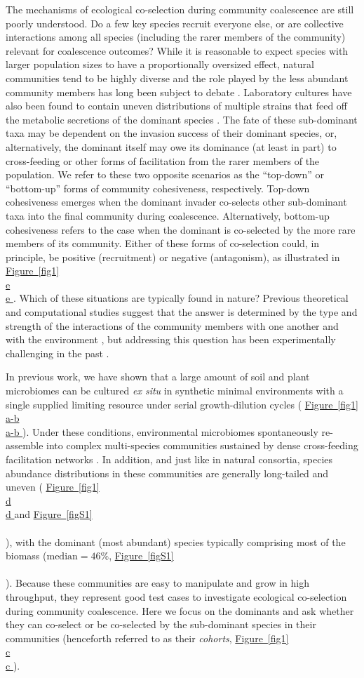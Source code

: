 \documentclass[a4paper,10pt]{article}
\newcommand{\figref}[2][]{%
  \hyperref[{#2}]{%
    Figure~\ref*{#2}%
    \ifx\\#1\\%
    \else
      #1%
    \fi
  }%
}
\begin{document}
The mechanisms of ecological co-selection during community coalescence are still poorly understood.
Do a few key species recruit everyone else, or are collective interactions among all species
(including the rarer members of the community) relevant for coalescence outcomes?
While it is reasonable to expect species with larger population sizes to have a proportionally oversized effect,
natural communities tend to be highly diverse \cite{Louca2016}
and
the role played by the less abundant community members has long been subject to debate \cite{Winfree2015}.
Laboratory cultures have also been found to contain uneven distributions of multiple strains that feed
off the metabolic secretions of the dominant species \cite{Rosenzweig1994,Goldford2018}.
The fate of these sub-dominant taxa may be dependent on the invasion success of their dominant
species, or, alternatively, the dominant itself may owe its dominance (at least in part) to cross-feeding
or other forms of facilitation from the rarer members of the population.
We refer to these two opposite scenarios as the
``top-down'' or ``bottom-up'' forms of community cohesiveness, respectively.
Top-down cohesiveness emerges when the dominant invader co-selects other sub-dominant taxa
into the final community during coalescence.
Alternatively, bottom-up cohesiveness refers to the case when the dominant is co-selected by
the more rare members of its community.
Either of these forms of co-selection could, in principle, be positive (recruitment) or negative (antagonism),
as illustrated in \figref[e]{fig1}.
Which of these situations are typically found in nature?
Previous theoretical and computational studies suggest that the answer is determined by the type and
strength of the interactions of the community members with one another and with the environment
\cite{Tikhonov2016,Vila2019,Lechon2021},
but addressing this question has been experimentally challenging in the past \cite{Rillig2017,Sierocinski2017}.

In previous work, we have shown that a large amount of soil and plant microbiomes can be cultured
\textit{ex situ} in synthetic minimal environments with a single supplied limiting resource under serial
growth-dilution cycles \cite{Goldford2018} (\figref[a-b]{fig1}). Under these conditions, environmental
microbiomes spontaneously re-assemble into complex multi-species communities sustained by dense
cross-feeding facilitation networks \cite{Goldford2018}. In addition,
and just like in natural consortia,
species abundance distributions
in these communities are generally long-tailed and uneven (\figref[d]{fig1} and \figref{figS1}),
with the dominant (most abundant) species typically comprising most of the biomass ($\text{median}=46\%$,
\figref{figS1}). Because these communities are easy to manipulate and grow in high throughput,
they represent good test cases to investigate ecological
co-selection during community coalescence. Here we focus on the dominants and ask whether they can
co-select or be co-selected by the sub-dominant species in their communities (henceforth referred to as
their \textit{cohorts}, \figref[c]{fig1}).
\end{document}
